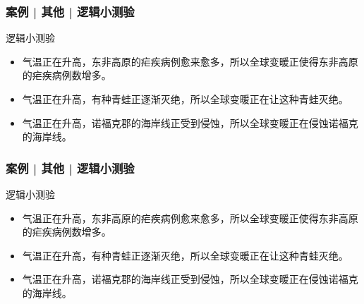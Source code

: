 \begin{frame}
  \frametitle{案例 | 其他 | 逻辑小测验}
  \begin{block}{逻辑小测验}
    \begin{itemize}
      \item 气温正在升高，东非高原的疟疾病例愈来愈多，所以全球变暖正使得东非高原的疟疾病例数增多。
      \item 气温正在升高，有种青蛙正逐渐灭绝，所以全球变暖正在让这种青蛙灭绝。
      \item 气温正在升高，诺福克郡的海岸线正受到侵蚀，所以全球变暖正在侵蚀诺福克的海岸线。
    \end{itemize}
  \end{block}
\end{frame}

\begin{frame}
  \frametitle{案例 | 其他 | 逻辑小测验}
  \begin{block}{逻辑小测验}
    \begin{itemize}
      \item 气温正在升高，东非高原的疟疾病例愈来愈多，所以全球变暖正使得东非高原的疟疾病例数增多。
      \item 气温正在升高，有种青蛙正逐渐灭绝，所以全球变暖正在让这种青蛙灭绝。
      \item 气温正在升高，诺福克郡的海岸线正受到侵蚀，所以全球变暖正在侵蚀诺福克的海岸线。
    \end{itemize}
  \end{block}
\end{frame}

